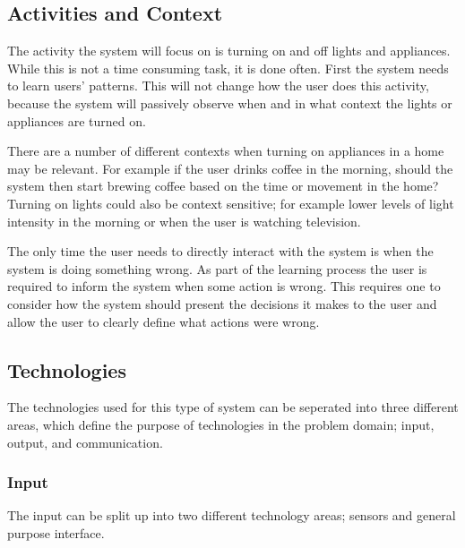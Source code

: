 \subsection{Activities and Context}
The activity the system will focus on is turning on and off lights and
appliances. While this is not a time consuming task, it is done often. First the
system needs to learn users' patterns. This will not change how the user does
this activity, because the system will passively observe when and in what
context the lights or appliances are turned on.

There are a number of different
contexts when turning on appliances in a home may be relevant.
For example if the user drinks coffee in the morning, should the system then
start brewing coffee based on the time or movement in the home? Turning on
lights could also be context sensitive; for example lower levels of light
intensity in the morning or when the user is watching television.

The only time the user needs to directly interact with the system is when the system is doing something wrong. As part of the learning process the user is required to inform the system when some action is wrong. This requires one to consider how the system should present the decisions it makes to the user and allow the user to clearly define what actions were wrong.

\subsection{Technologies}
\label{sub:Technologies}
The technologies used for this type of system can be seperated into three different areas, which define the purpose of technologies in the problem domain; input, output, and communication.
\subsubsection{Input}
The input can be split up into two different technology areas; sensors and general purpose interface.

